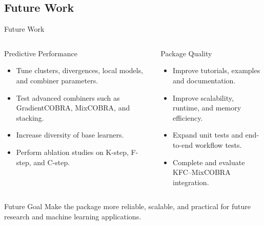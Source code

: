 \subsection{Future Work}

\begin{frame}[t]{Future Work}
    \footnotesize

    \begin{columns}[T,onlytextwidth]

        \begin{block}{Predictive Performance}
            \begin{itemize}
                \setlength\itemsep{0.12cm}
                \item Tune clusters, divergences, local models, and combiner parameters.
                \item Test advanced combiners such as GradientCOBRA, MixCOBRA, and stacking.
                \item Increase diversity of base learners.
                \item Perform ablation studies on K-step, F-step, and C-step.
            \end{itemize}
        \end{block}

        \begin{block}{Package Quality}
            \begin{itemize}
                \setlength\itemsep{0.12cm}
                \item Improve tutorials, examples and documentation.
                \item Improve scalability, runtime, and memory efficiency.
                \item Expand unit tests and end-to-end workflow tests.
                \item Complete and evaluate KFC–MixCOBRA integration.
            \end{itemize}
        \end{block}
    \end{columns}

    \vspace{0.25cm}

    \begin{block}{Future Goal}
        Make the package more reliable, scalable, and practical for future research and machine learning applications.
    \end{block}

\end{frame}
